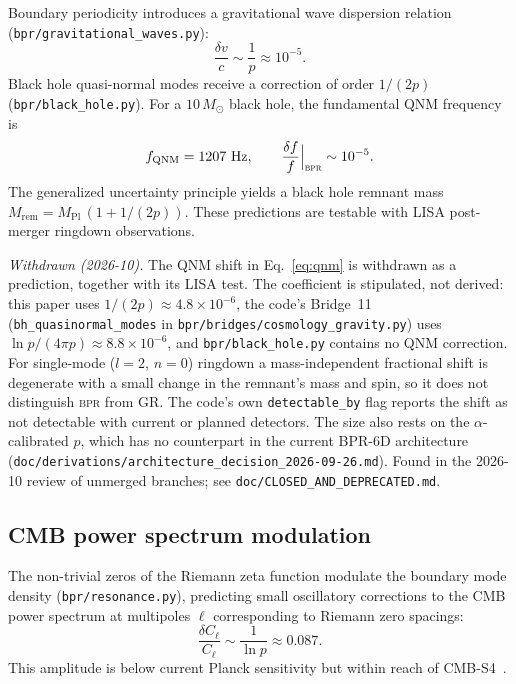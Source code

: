 \documentclass[aps,prd,twocolumn,superscriptaddress,longbibliography,nofootinbib]{revtex4-2}
\newcommand{\MPl}{M_{\mathrm{Pl}}}
\newcommand{\bpr}{\textsc{bpr}}
\begin{document}
Boundary periodicity introduces a gravitational wave dispersion
relation (\texttt{bpr/gravitational\_waves.py}):
\begin{equation}
\frac{\delta v}{c} \sim \frac{1}{p} \approx 10^{-5}.
\label{eq:gw_dispersion}
\end{equation}
Black hole quasi-normal modes receive a correction of order
$1/(2p)$ (\texttt{bpr/black\_hole.py}).  For a $10\,M_\odot$ black
hole, the fundamental QNM frequency is
\begin{equation}
f_{\mathrm{QNM}} = 1207~\text{Hz}, \qquad
\frac{\delta f}{f}\Big|_{\bpr} \sim 10^{-5}.
\label{eq:qnm}
\end{equation}
The generalized uncertainty principle yields a black hole remnant
mass $M_{\mathrm{rem}} = \MPl\,(1 + 1/(2p))$.  These predictions
are testable with LISA post-merger ringdown observations.

\textit{Withdrawn (2026-10).}  The QNM shift in Eq.~\eqref{eq:qnm}
is withdrawn as a prediction, together with its LISA test.  The
coefficient is stipulated, not derived: this paper uses $1/(2p)
\approx 4.8\times10^{-6}$, the code's Bridge~11
(\texttt{bh\_quasinormal\_modes} in
\texttt{bpr/bridges/cosmology\_gravity.py}) uses $\ln p/(4\pi p)
\approx 8.8\times10^{-6}$, and \texttt{bpr/black\_hole.py} contains
no QNM correction.  For single-mode ($l=2$, $n=0$) ringdown a
mass-independent fractional shift is degenerate with a small change
in the remnant's mass and spin, so it does not distinguish \bpr{}
from GR.  The code's own \texttt{detectable\_by} flag reports the
shift as not detectable with current or planned detectors.  The
size also rests on the $\alpha$-calibrated $p$, which has no
counterpart in the current BPR-6D architecture
(\texttt{doc/derivations/architecture\_decision\_2026-09-26.md}).
Found in the 2026-10 review of unmerged branches; see
\texttt{doc/CLOSED\_AND\_DEPRECATED.md}.

\subsection{CMB power spectrum modulation}

The non-trivial zeros of the Riemann zeta function modulate the
boundary mode density (\texttt{bpr/resonance.py}), predicting small
oscillatory corrections to the CMB power spectrum at multipoles
$\ell$ corresponding to Riemann zero spacings:
\begin{equation}
\frac{\delta C_\ell}{C_\ell} \sim \frac{1}{\ln p} \approx 0.087.
\label{eq:cmb_mod}
\end{equation}
This amplitude is below current Planck sensitivity but within reach
of CMB-S4~\cite{CMBS4}.
\end{document}
